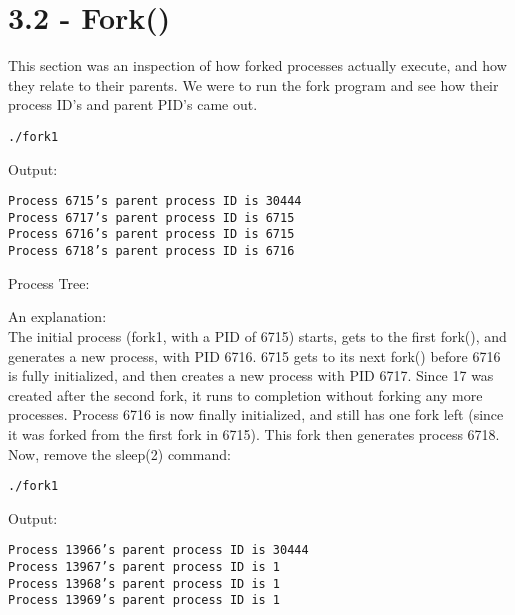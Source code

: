 \documentclass[11pt]{report}
\begin{document}
\section*{3.2 - Fork()}
This section was an inspection of how forked processes actually execute, and how they relate to their parents. We were to run the fork program and see how their process ID's and parent PID's came out.

\begin{verbatim}
./fork1
\end{verbatim}

Output:

\begin{verbatim}
Process 6715’s parent process ID is 30444
Process 6717’s parent process ID is 6715
Process 6716’s parent process ID is 6715
Process 6718’s parent process ID is 6716
\end{verbatim}

Process Tree:
\\
\begin{center}
\end{center}
An explanation:
\\
The initial process (fork1, with a PID of 6715) starts, gets to the first fork(), and generates a new process, with PID 6716. 6715 gets to its next fork() before 6716 is fully initialized, and then creates a new process with PID 6717. Since 17 was created after the second fork, it runs to completion without forking any more processes. Process 6716 is now finally initialized, and still has one fork left (since it was forked from the first fork in 6715). This fork then generates process 6718.
\\
Now, remove the sleep(2) command:

\begin{verbatim}
./fork1
\end{verbatim}

Output:

\begin{verbatim}
Process 13966’s parent process ID is 30444
Process 13967’s parent process ID is 1
Process 13968’s parent process ID is 1
Process 13969’s parent process ID is 1
\end{verbatim}
\end{document}
